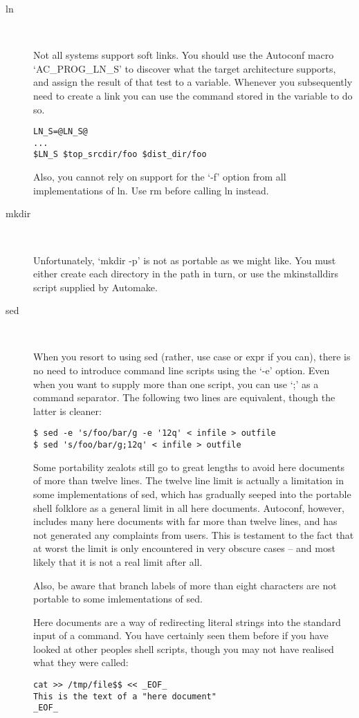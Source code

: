 \begin{description}
\item[ln]
\

Not all systems support soft links. You should use the Autoconf 
macro `AC\_{}PROG\_{}LN\_{}S' to discover what the target architecture 
supports, and assign the result of that test to a variable. Whenever you subsequently need to create a link you can use the command stored in the variable to do so.

\begin{Verbatim}[frame=single]
LN_S=@LN_S@
...
$LN_S $top_srcdir/foo $dist_dir/foo
\end{Verbatim}

    Also, you cannot rely on support for the `-f' option from all implementations of ln. Use rm before calling ln instead.

\item[mkdir]
\

    Unfortunately, `mkdir -p' is not as portable as we might like. You must either create each directory in the path in turn, or use the mkinstalldirs script supplied by Automake.

\item[sed]
\

    When you resort to using sed (rather, use case or expr if you can), there is no need to introduce command line scripts using the `-e' option. Even when you want to supply more than one script, you can use `;' as a command separator. The following two lines are equivalent, though the latter is cleaner:

\begin{Verbatim}[frame=single]
$ sed -e 's/foo/bar/g -e '12q' < infile > outfile
$ sed 's/foo/bar/g;12q' < infile > outfile
\end{Verbatim}

    Some portability zealots still go to great lengths to avoid here documents of more than twelve lines. The twelve line limit is actually a limitation in some implementations of sed, which has gradually seeped into the portable shell folklore as a general limit in all here documents. Autoconf, however, includes many here documents with far more than twelve lines, and has not generated any complaints from users. This is testament to the fact that at worst the limit is only encountered in very obscure cases -- and most likely that it is not a real limit after all.

    Also, be aware that branch labels of more than eight characters are not portable to some imlementations of sed. 

    Here documents are a way of redirecting literal strings into the standard input of a command. You have certainly seen them before if you have looked at other peoples shell scripts, though you may not have realised what they were called:

\begin{Verbatim}[frame=single]
cat >> /tmp/file$$ << _EOF_
This is the text of a "here document"
_EOF_
\end{Verbatim}

\end{description}

